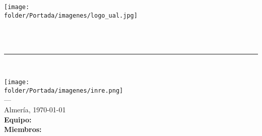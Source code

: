 \begin{titlepage}
 


\noindent\hspace*{\centeroffset}\begin{minipage}{\textwidth}

\centering
\texttt{[image: \\folder/Portada/imagenes/logo\_ual.jpg]}\\[0.8cm]

\textsc{ \Huge \miProyecto \\[0.7cm]}

{\Huge\bfseries \tipoDoc \\ }
\noindent\rule[-1ex]{\textwidth}{3pt}\\[3ex]

\end{minipage}

\vspace{2.3cm}
\noindent\hspace*{\centeroffset}\begin{minipage}{\textwidth}
\centering

\texttt{[image: \\folder/Portada/imagenes/inre.png]}\\[0.1cm]

\textsc{---}\\
Almería, \today \\[1cm]

\textbf{Equipo:} {\equipo}\\[0.2cm]
\textbf{Miembros:}\\ {\primerAl\\ \segunAl \\ \tercerAl \\ \cuartoAl}\\[1cm]


\end{minipage}

\end{titlepage}



